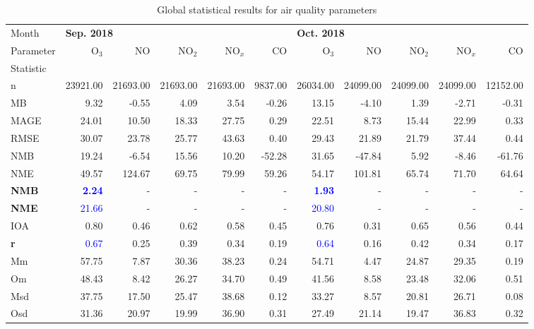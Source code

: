 \begin{table}
\begin{threeparttable}[b]
\footnotesize
\centering
\caption{Global statistical results for air quality parameters}
\label{tab: gl_st}
\begin{tabular}{lrrrrrrrrrr}
\toprule
{Month} & \multicolumn{5}{l}{\bf Sep. 2018} & \multicolumn{5}{l}{\bf Oct. 2018} \\
{Parameter} &    O$_3$ &        NO &    NO$_2$ &    NO$_x$ &       CO &   O$_3$ &        NO &    NO$_2$ &    NO$_x$ &        CO \\
Statistic\tnote{(a)} \\
\midrule
n     &  23921.00 &  21693.00 &  21693.00 &  21693.00 &  9837.00 &  26034.00 &  24099.00 &  24099.00 &  24099.00 &  12152.00 \\
MB    &      9.32 &     -0.55 &      4.09 &      3.54 &    -0.26 &     13.15 &     -4.10 &      1.39 &     -2.71 &     -0.31 \\
MAGE  &     24.01 &     10.50 &     18.33 &     27.75 &     0.29 &     22.51 &      8.73 &     15.44 &     22.99 &      0.33 \\
RMSE  &     30.07 &     23.78 &     25.77 &     43.63 &     0.40 &     29.43 &     21.89 &     21.79 &     37.44 &      0.44 \\
NMB\tnote{(b)}  &     19.24 &     -6.54 &     15.56 &     10.20 &   -52.28 &     31.65 &    -47.84 &      5.92 &     -8.46 &    -61.76 \\
NME\tnote{(b)}  &     49.57 &    124.67 &     69.75 &     79.99 &    59.26 &     54.17 &    101.81 &     65.74 &     71.70 &     64.64 \\
\bf{NMB}\tnote{(c)}  &  \textcolor{blue}{\bf 2.24} &    - &     - &     - &   - &      \textcolor{blue}{\bf 1.93} & - &  - &     - &   - \\
\bf{NME}\tnote{(c)}  &     \textcolor{blue}{21.66} &    - &     - &     - &    - &     \textcolor{blue}{20.80} &    - &     - &   - &  - \\
IOA  &      0.80 &      0.46 &      0.62 &      0.58 &     0.45 &      0.76 &      0.31 &      0.65 &      0.56 &      0.44 \\
\textbf{r }   &      \textcolor{blue}{0.67} &      0.25 &      0.39 &      0.34 &     0.19 &      \textcolor{blue}{0.64} &      0.16 &      0.42 &      0.34 &      0.17 \\
Mm    &     57.75 &      7.87 &     30.36 &     38.23 &     0.24 &     54.71 &      4.47 &     24.87 &     29.35 &      0.19 \\
Om    &     48.43 &      8.42 &     26.27 &     34.70 &     0.49 &     41.56 &      8.58 &     23.48 &     32.06 &      0.51 \\
Msd   &     37.75 &     17.50 &     25.47 &     38.68 &     0.12 &     33.27 &      8.57 &     20.81 &     26.71 &      0.08 \\
Osd   &     31.36 &     20.97 &     19.99 &     36.90 &     0.31 &     27.49 &     21.14 &     19.47 &     36.83 &      0.32 \\


\end{tabular}
\end{threeparttable}
\end{table}
